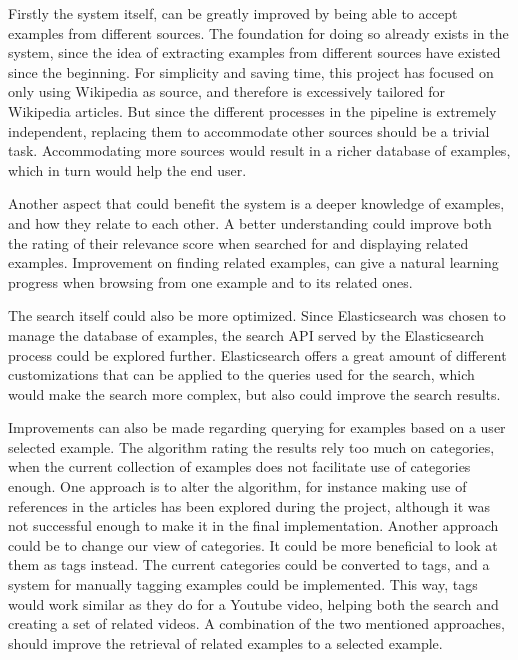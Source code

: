 Firstly the system itself, can be greatly improved by being able to accept examples from different sources. The foundation for doing so already exists in the system, since the idea of extracting examples from different sources have existed since the beginning. For simplicity and saving time, this project has focused on only using Wikipedia as source, and therefore is excessively tailored for Wikipedia articles. But since the different processes in the pipeline is extremely independent, replacing them to accommodate other sources should be a trivial task. Accommodating more sources would result in a richer database of examples, which in turn would help the end user.

Another aspect that could benefit the system is a deeper knowledge of examples, and how they relate to each other. A better understanding could improve both the rating of their relevance score when searched for and displaying related examples. Improvement on finding related examples, can give a natural learning progress when browsing from one example and to its related ones.

The search itself could also be more optimized. Since Elasticsearch was chosen to manage the database of examples, the search API served by the Elasticsearch process could be explored further. Elasticsearch offers a great amount of different customizations that can be applied to the queries used for the search, which would make the search more complex, but also could improve the search results.

Improvements can also be made regarding querying for examples based on a user selected example. The algorithm rating the results rely too much on categories, when the current collection of examples does not facilitate use of categories enough. One approach is to alter the algorithm, for instance making use of references in the articles has been explored during the project, although it was not successful enough to make it in the final implementation. Another approach could be to change our view of categories. It could be more beneficial to look at them as tags instead. The current categories could be converted to tags, and a system for manually tagging examples could be implemented. This way, tags would work similar as they do for a Youtube video, helping both the search and creating a set of related videos. A combination of the two mentioned approaches, should improve the retrieval of related examples to a selected example.


\cleardoublepage